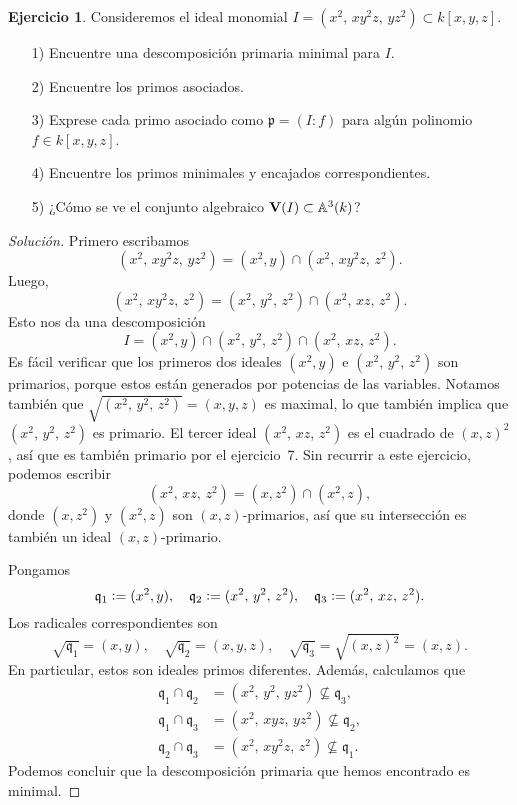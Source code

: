 \documentclass{article}
\theoremstyle{definition}
\newtheorem{ejerc}{Ejercicio}
\newenvironment{solucion}{\begin{proof}[Solución]}{\end{proof}}
\begin{document}
\begin{ejerc}
  Consideremos el ideal monomial
  $I = (x^2, \, xy^2z, \, yz^2) \subset k [x,y,z]$.

  \begin{enumerate}
  \item[1)] Encuentre una descomposición primaria minimal para $I$.

  \item[2)] Encuentre los primos asociados.

  \item[3)] Exprese cada primo asociado como $\mathfrak{p} = (I : f)$ para algún
    polinomio $f \in k [x,y,z]$.

  \item[4)] Encuentre los primos minimales y encajados correspondientes.

  \item[5)] ¿Cómo se ve el conjunto algebraico
    $\mathbf{V} (I) \subset \AA^3 (k)$?
  \end{enumerate}

  \ifdefined\solutions\begin{solucion}
    Primero escribamos
    $$(x^2, \, xy^2z, \, yz^2) = (x^2, y) \cap (x^2, \, xy^2z, \, z^2).$$
    Luego,
    \[ (x^2, \, xy^2z, \, z^2) =
       (x^2, \, y^2, \, z^2) \cap (x^2, \, xz, \, z^2). \]
    Esto nos da una descomposición
    $$I = (x^2, y) \cap (x^2, \, y^2, \, z^2) \cap (x^2, \, xz, \, z^2).$$
    Es fácil verificar que los primeros dos ideales $(x^2,y)$ e
    $(x^2, \, y^2, \, z^2)$ son primarios, porque estos están generados por
    potencias de las variables. Notamos también que
    $\sqrt{(x^2, \, y^2, \, z^2)} = (x,y,z)$ es maximal, lo que también implica
    que $(x^2, \, y^2, \, z^2)$ es primario. El tercer ideal
    $(x^2, \, xz, \, z^2)$ es el cuadrado de $(x, z)^2$, así que es también
    primario por el ejercicio~7. Sin recurrir a este ejercicio, podemos escribir
    $$(x^2, \, xz, \, z^2) = (x, z^2) \cap (x^2, z),$$
    donde $(x,z^2)$ y $(x^2,z)$ son $(x,z)$-primarios, así que su intersección
    es también un ideal $(x,z)$-primario.

    Pongamos
    \[ \mathfrak{q}_1 \dfn (x^2, y), \quad
       \mathfrak{q}_2 \dfn (x^2, \, y^2, \, z^2), \quad
       \mathfrak{q}_3 \dfn (x^2, \, xz, \, z^2). \]
    Los radicales correspondientes son
    \[ \sqrt{\mathfrak{q}_1} = (x,y), \quad
       \sqrt{\mathfrak{q}_2} = (x,y,z), \quad
       \sqrt{\mathfrak{q}_3} = \sqrt{(x,z)^2} = (x,z). \]
    En particular, estos son ideales primos diferentes. Además, calculamos que
    \begin{align*}
      \mathfrak{q}_1 \cap \mathfrak{q}_2 & = (x^2, \, y^2, \, yz^2)
                                           \not\subseteq \mathfrak{q}_3,\\
      \mathfrak{q}_1 \cap \mathfrak{q}_3 & = (x^2, \, xyz, \, yz^2)
                                           \not\subseteq \mathfrak{q}_2,\\
      \mathfrak{q}_2 \cap \mathfrak{q}_3 & = (x^2, \, xy^2z, \, z^2)
                                           \not\subseteq \mathfrak{q}_1.
    \end{align*}
    Podemos concluir que la descomposición primaria que hemos encontrado es
    minimal.


\end{solucion}
\end{ejerc}
\end{document}
